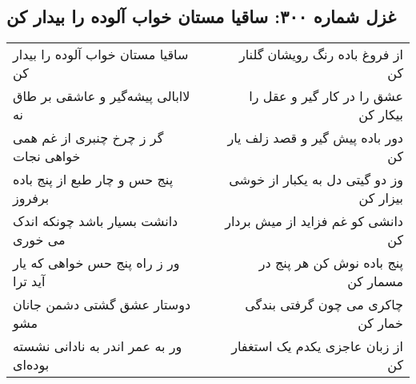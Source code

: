 \begin{center}
\section*{غزل شماره ۳۰۰: ساقیا مستان خواب آلوده را بیدار کن}
\label{sec:300}
\begin{longtable}{l p{0.5cm} r}
ساقیا مستان خواب آلوده را بیدار کن
&&
از فروغ باده رنگ رویشان گلنار کن
\\
لاابالی پیشه‌گیر و عاشقی بر طاق نه
&&
عشق را در کار گیر و عقل را بیکار کن
\\
گر ز چرخ چنبری از غم همی خواهی نجات
&&
دور باده پیش گیر و قصد زلف یار کن
\\
پنج حس و چار طبع از پنج باده برفروز
&&
وز دو گیتی دل به یکبار از خوشی بیزار کن
\\
دانشت بسیار باشد چونکه اندک می خوری
&&
دانشی کو غم فزاید از میش بردار کن
\\
ور ز راه پنج حس خواهی که یار آید ترا
&&
پنج باده نوش کن هر پنج در مسمار کن
\\
دوستار عشق گشتی دشمن جانان مشو
&&
چاکری می چون گرفتی بندگی خمار کن
\\
ور به عمر اندر به نادانی نشسته بوده‌ای
&&
از زبان عاجزی یکدم یک استغفار کن
\\
\end{longtable}
\end{center}
